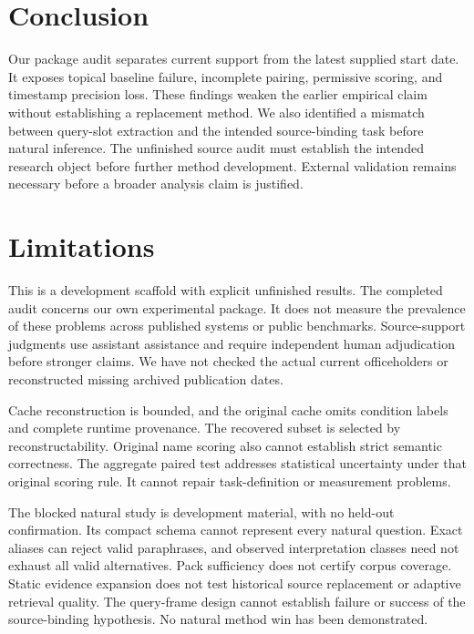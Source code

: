 \documentclass[11pt]{article}
\begin{document}
\section{Conclusion}

Our package audit separates current support from the latest supplied start date.
It exposes topical baseline failure, incomplete pairing, permissive scoring, and timestamp precision loss.
These findings weaken the earlier empirical claim without establishing a replacement method.
We also identified a mismatch between query-slot extraction and the intended source-binding task before natural inference.
The unfinished source audit must establish the intended research object before further method development.
External validation remains necessary before a broader analysis claim is justified.
\label{v26-main-end}

\clearpage
\section*{Limitations}

This is a development scaffold with explicit unfinished results.
The completed audit concerns our own experimental package.
It does not measure the prevalence of these problems across published systems or public benchmarks.
Source-support judgments use assistant assistance and require independent human adjudication before stronger claims.
We have not checked the actual current officeholders or reconstructed missing archived publication dates.

Cache reconstruction is bounded, and the original cache omits condition labels and complete runtime provenance.
The recovered subset is selected by reconstructability.
Original name scoring also cannot establish strict semantic correctness.
The aggregate paired test addresses statistical uncertainty under that original scoring rule.
It cannot repair task-definition or measurement problems.

The blocked natural study is development material, with no held-out confirmation.
Its compact schema cannot represent every natural question.
Exact aliases can reject valid paraphrases, and observed interpretation classes need not exhaust all valid alternatives.
Pack sufficiency does not certify corpus coverage.
Static evidence expansion does not test historical source replacement or adaptive retrieval quality.
The query-frame design cannot establish failure or success of the source-binding hypothesis.
No natural method win has been demonstrated.
\end{document}
